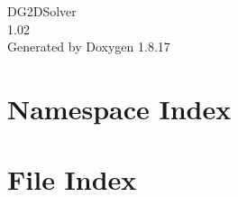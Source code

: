 \let\mypdfximage\pdfximage\def\pdfximage{\immediate\mypdfximage}\documentclass[twoside]{book}
\newcommand{\+}{\discretionary{\mbox{\scriptsize$\hookleftarrow$}}{}{}}
\newcommand{\clearemptydoublepage}{%
  \newpage{\pagestyle{empty}\cleardoublepage}%
}
\begin{document}
\hypersetup{pageanchor=false,
             bookmarksnumbered=true,
             pdfencoding=unicode
            }
\begin{titlepage}
\vspace*{7cm}
\begin{center}%
{\Large D\+G2\+D\+Solver \\[1ex]\large 1.\+02 }\\
\vspace*{1cm}
{\large Generated by Doxygen 1.8.17}\\
\end{center}
\end{titlepage}
\clearemptydoublepage
{}
\tableofcontents
\clearemptydoublepage
{}
\hypersetup{pageanchor=true}

\chapter{Namespace Index}

\chapter{File Index}

\end{document}
